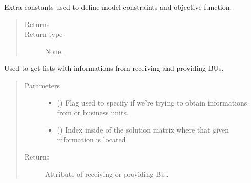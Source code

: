 \documentclass[letterpaper,10pt,english]{sphinxmanual}
\begin{document}
\begin{fulllineitems}
\begin{fulllineitems}
\label{\detokenize{source/optimization.model:optimization.model.optimizer.OptimizationModel._specify_extra_constants}}
Extra constants used to define model constraints and objective function.
\begin{quote}\begin{description}
\item[{Returns}] \leavevmode


\item[{Return type}] \leavevmode
None.

\end{description}\end{quote}

\end{fulllineitems}


\begin{fulllineitems}
\label{\detokenize{source/optimization.model:optimization.model.optimizer.OptimizationModel._specify_how}}
Used to get lists with informations from receiving and providing BUs.
\begin{quote}\begin{description}
\item[{Parameters}] \leavevmode\begin{itemize}
\item {} 
 () \textendash{} Flag used to specify if we’re trying to obtain informations from  or  business units.

\item {} 
 () \textendash{} Index inside of the solution matrix where that given information is located.

\end{itemize}

\item[{Returns}] \leavevmode
Attribute of receiving or providing BU.


\end{description}
\end{quote}
\end{fulllineitems}
\end{fulllineitems}
\end{document}

